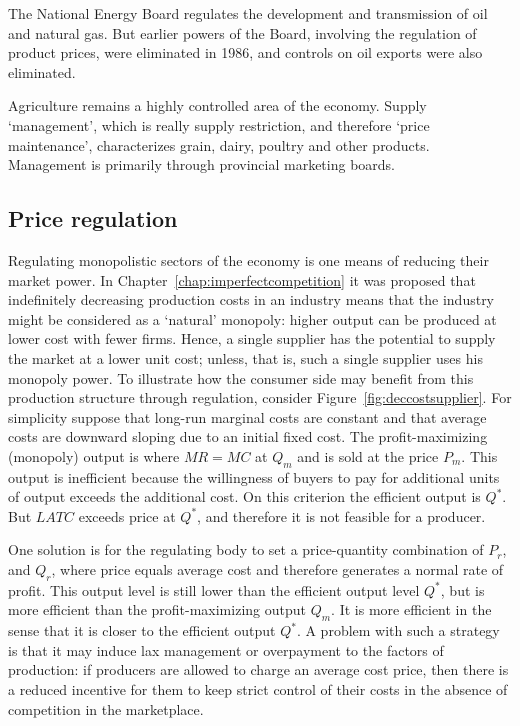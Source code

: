 The National Energy Board regulates the development and transmission of oil and natural gas. But earlier powers of the Board, involving the regulation of product prices, were eliminated in 1986, and controls on oil exports were also eliminated. 

Agriculture remains a highly controlled area of the economy. Supply `management', which is really supply restriction, and therefore `price maintenance', characterizes grain, dairy, poultry and other products. Management is primarily through provincial marketing boards. 

\subsection*{Price regulation}

Regulating monopolistic sectors of the economy is one means of reducing their market power. In Chapter~\ref{chap:imperfectcompetition} it was proposed that indefinitely decreasing production costs in an industry means that the industry might be considered as a `natural' monopoly: higher output can be produced at lower cost with fewer firms. Hence, a single supplier has the potential to supply the market at a lower unit cost; unless, that is, such a single supplier uses his monopoly power. To illustrate how the consumer side may benefit from this production structure through regulation, consider Figure~\ref{fig:deccostsupplier}. For simplicity suppose that long-run marginal costs are constant and that average costs are downward sloping due to an initial fixed cost. The profit-maximizing (monopoly) output is where $MR=MC$ at $Q_m$ and is sold at the price $P_m$. This output is inefficient because the willingness of buyers to pay for additional units of output exceeds the additional cost. On this criterion the efficient output is $Q^*$. But $LATC$ exceeds price at $Q^*$, and therefore it is not feasible for a producer.



One solution is for the regulating body to set a price-quantity combination of $P_r$, and $Q_r$, where price equals average cost and therefore generates a normal rate of profit. This output level is still lower than the efficient output level $Q^*$, but is more efficient than the profit-maximizing output $Q_m$. It is more efficient in the sense that it is closer to the efficient output $Q^*$. A problem with such a strategy is that it may induce lax management or overpayment to the factors of production: if producers are allowed to charge an average cost price, then there is a reduced incentive for them to keep strict control of their costs in the absence of competition in the marketplace.

